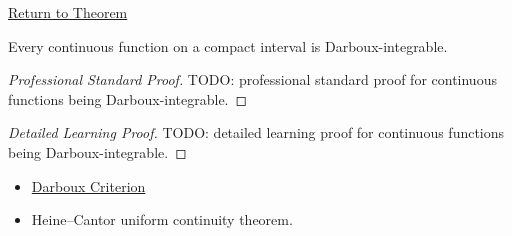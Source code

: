 \newpage
{}
\label{prf:continuous-darboux-integrable}

\begin{remark*}[Return]
\hyperref[thm:continuous-darboux-integrable]{Return to Theorem}
\end{remark*}

\begin{theorem*}
Every continuous function on a compact interval is Darboux-integrable.
\end{theorem*}

\begin{proof}[Professional Standard Proof]
\LRAProofBodyStart
TODO: professional standard proof for continuous functions being Darboux-integrable.
\end{proof}

\begin{proof}[Detailed Learning Proof]
\LRAProofBodyStart
TODO: detailed learning proof for continuous functions being Darboux-integrable.
\end{proof}

\begin{remark*}
\end{remark*}

\begin{dependencies}
\begin{itemize}
  \item \hyperref[thm:darboux-criterion]{Darboux Criterion}
  \item Heine--Cantor uniform continuity theorem.
\end{itemize}
\end{dependencies}

\clearpage
